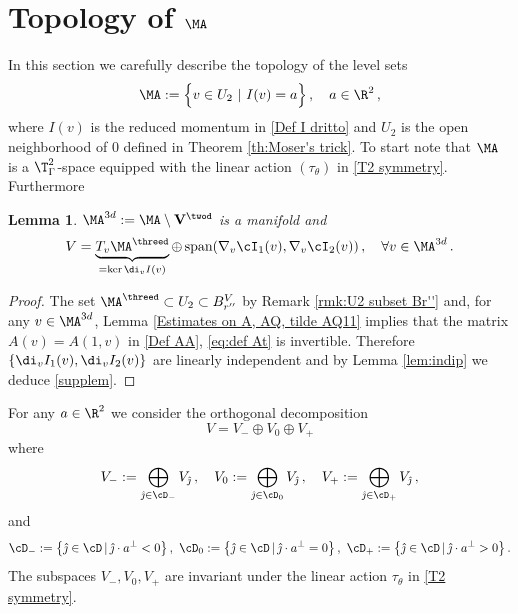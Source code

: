 \documentclass[11pt,a4paper,reqno]{article}
\numberwithin{equation}{section}
\newtheorem{lemma}[theorem]{Lemma}
\theoremstyle{definition}
\begin{document}
\section{Topology of $ \MA$}

In this section we carefully 
describe the topology of  
the  level sets 
\begin{equation}\label{defSa}
     \MA:=
    \Big\{ v\in U_2  \ | 
    \ I(v)=a \Big\}  \, , \quad a \in \R^2 \, , 
\end{equation}
where $ I(v)$ is the reduced momentum in \eqref{Def I dritto}
and
$U_2 $ is the open neighborhood of $ 0 $ defined  in Theorem \ref{th:Moser's trick}.
To  start 
note that 
$ \MA $
  is a $ \T^2_\Gamma $-space 
equipped with the linear action $ (\tau_\theta ) $
in \eqref{T2 symmetry}.
Furthermore 

\begin{lemma}\label{rmk:nablaI12}
   $ \MA^{3d} := \MA \setminus {\bf V}^{\twod} $ is a manifold and
\begin{equation}\label{supplem}
    V= \underbrace{T_v\MA^{\threed}}_{= \ker \di_v I (v)  }\oplus \, \text{span}(\nabla_v \cI_1(v),\nabla_v \cI_2(v))\, ,
    \quad 
\forall  v \in \MA^{3d} \,  .
\end{equation}
\end{lemma}

\begin{proof}
  The set  $\MA^{\threed}\subset U_2\subset B_{r''}^V$  by  Remark \ref{rmk:U2 subset Br''} and, for any 
  $ v \in \MA^{3d} $,   Lemma \ref{Estimates on A, AQ, tilde AQ11} implies that the matrix $A(v)=A(1,v)$ in \eqref{Def AA}, \eqref{eq:def At}  is invertible.
    Therefore $
     \{\di_v I_1(v),\di_v I_2(v)\}$  are linearly independent and by Lemma \ref{lem:indip} we deduce \eqref{supplem}.
\end{proof}

For any $ a \in \R^2 $ we consider the orthogonal 
decomposition  
\begin{equation}\label{eq:def V-0+}
    V = V_- \oplus V_0 \oplus V_+   
 \end{equation}   
where
\begin{equation}\label{eq:def cD-0+}
V_-:=\bigoplus_{\hat \jmath \in \cD_- }V_{\hat \jmath}\, , \quad  V_0:=\bigoplus_{\hat \jmath \in \cD_0} V_{\hat \jmath} \, , \quad  V_+:=\bigoplus_{\hat \jmath \in \cD_+ }V_{\hat \jmath}  \, , \end{equation}
and
$$
     \cD_-:= \big\{ \hat \jmath\in \cD \, | \, \hat \jmath 
     \cdot a^\bot <0 \big\} \, ,      \ 
        \cD_0:= \big\{ \hat \jmath\in \cD \, | \, 
        \hat \jmath \cdot a^\bot =0 \big\}\, , \ \cD_+:= \big\{ \hat \jmath\in \cD \, | \, 
        \hat \jmath \cdot a^\bot  >0 
        \big\}\, .
$$
The subspaces 
$ V_-, V_0, V_+ $ are  invariant
under the linear action $ \tau_\theta $ in \eqref{T2 symmetry}.
\end{document}
